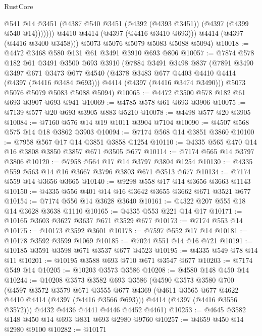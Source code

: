 \begin{lexlean}{RustCore}
\begin{coremodule}
                  @541
                  @14
                  @3451
                  (@4387 @540 @3451 (@4392 (@4393 @3451)) (@4397 (@4399 @540 @14)))))))
          @4410
          @4414
          (@4397 (@4416 @3410 @693)))
        @4414
        (@4397 (@4416 @3400 @3458)))
      @5073
      @5076
      @5079
      @5083
      @5088
      @5094)
@10018 := @4472 @3468 @580 @131 @61 @3491 @3910 @693 @806
@10057 := @7874
    @578
    @182
    @61
    @3491
    @3500
    @693
    @3910
    (@7884
      @3491
      @3498
      @837
      (@7891
        @3490
        @3497
        @671
        @3473
        @677
        @4540
        (@4378 @3483 @677 @4403 @4410 @4414 (@4397 (@4416 @3484 @693)))
        @4414
        (@4397 (@4416 @3474 @3490)))
      @5073
      @5076
      @5079
      @5083
      @5088
      @5094)
@10065 := @4472 @3500 @578 @182 @61 @693 @3907 @693 @941
@10069 := @4785 @578 @61 @693 @3906
@10075 := @7139 @577 @20 @693 @3905 @883 @5210
@10078 := @4498 @577 @20 @3905
@10084 := @7160 @576 @14 @19 @1011 @3904 @7104
@10090 := @4507 @568 @575 @14 @18 @3862 @3903
@10094 := @7174 @568 @14 @3851 @3860
@10100 := @7958 @567 @17 @14 @3851 @3858 @1254
@10110 := @4335 @565 @470 @14 @16 @3808 @3850 @3857 @671 @3505 @677
@10114 := @7174 @565 @14 @3797 @3806
@10120 := @7958 @564 @17 @14 @3797 @3804 @1254
@10130 := @4335 @559 @563 @14 @16 @3667 @3796 @3803 @671 @3513 @677
@10134 := @7174 @559 @14 @3656 @3665
@10140 := @9298 @558 @17 @14 @3656 @3663 @1143
@10150 := @4335 @556 @401 @14 @16 @3642 @3655 @3662 @671 @3521 @677
@10154 := @7174 @556 @14 @3628 @3640
@10161 := @4322 @207 @555 @18 @14 @3628 @3638 @1110
@10165 := @4335 @553 @221 @14 @17
@10171 := @10165 @3603 @3627 @3637 @671 @3529 @677
@10173 := @7174 @553 @14
@10175 := @10173 @3592 @3601
@10178 := @7597 @552 @17 @14
@10181 := @10178 @3592 @3599 @1069
@10185 := @7024 @551 @14 @16 @721
@10191 := @10185 @3591 @3598 @671 @3537 @677 @4523
@10195 := @4335 @549 @78 @14 @11
@10201 := @10195 @3588 @693 @710 @671 @3547 @677
@10203 := @7174 @549 @14
@10205 := @10203 @3573 @3586
@10208 := @4580 @148 @450 @14
@10244 := @10208
    @3573
    @3582
    @693
    @3586
    (@4590
      @3573
      @3580
      @700
      (@4597
        @3572
        @3579
        @671
        @3555
        @677
        @4369
        (@4611 @3565 @677 @4622 @4410 @4414 (@4397 (@4416 @3566 @693)))
        @4414
        (@4397 (@4416 @3556 @3572)))
      @4432
      @4436
      @4441
      @4446
      @4452
      @4461)
@10253 := @4645 @3582 @148 @450 @14 @693 @831 @693 @2980 @9760
@10257 := @4659 @450 @14 @2980 @9100
@10282 := @10171

\end{coremodule}
\end{lexlean}
